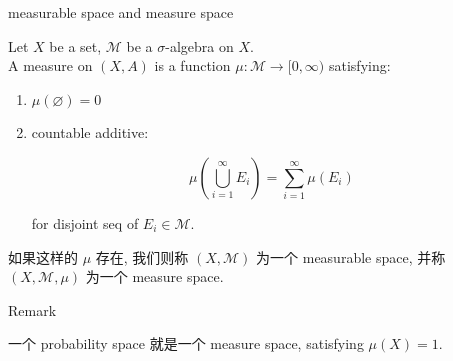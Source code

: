 \documentclass{qlnotes-export}
\begin{document}
\begin{definition}{measurable space and measure space}\label{def-01-sigma-algebra-measure-measurable-space-and-measure-space}

Let \(X\) be a set, \(\mathcal{M}\) be a \(\sigma\)-algebra on \(X\).\\
A measure on \((X,A)\) is a function \(\mu:\mathcal{M}\rightarrow\lbrack 0,\infty)\) satisfying:

\begin{enumerate}
\item
  \(\mu(\varnothing) = 0\)
\item
  countable additive:

  \[\mu(\bigcup\limits_{i = 1}^{\infty}E_{i}) = \sum\limits_{i = 1}^{\infty}\mu(E_{i})\]

  for disjoint seq of \(E_{i} \in \mathcal{M}\).
\end{enumerate}

如果这样的 \(\mu\) 存在, 我们则称 \((X,\mathcal{M})\) 为一个 measurable space, 并称 \((X,\mathcal{M},\mu)\) 为一个 measure space.

\end{definition}

\begin{qlremark}{Remark}

一个 probability space 就是一个 measure space, satisfying \(\mu(X) = 1\).

\end{qlremark}
\end{document}
